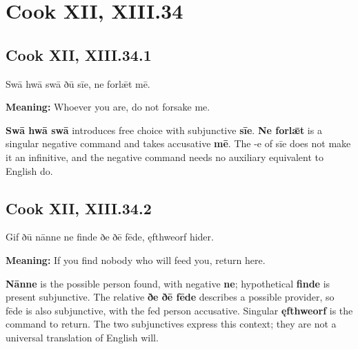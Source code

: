 \clearpage
\section*{Cook XII, XIII.34}

\par\begin{minipage}{\linewidth}\raggedright
\subsection*{Cook XII, XIII.34.1}

Swā hwā swā ðū sīe, ne forlǣt mē.

\textbf{Meaning:} Whoever you are, do not forsake me.

\textbf{Swā hwā swā} introduces free choice with subjunctive \textbf{sīe}. \textbf{Ne forlǣt} is a singular negative command and takes accusative \textbf{mē}. The -e of sīe does not make it an infinitive, and the negative command needs no auxiliary equivalent to English do.

\end{minipage}\par\addvspace{4pt}

\par\begin{minipage}{\linewidth}\raggedright
\subsection*{Cook XII, XIII.34.2}

Gif ðū nānne ne finde ðe ðē fēde, ęfthweorf hider.

\textbf{Meaning:} If you find nobody who will feed you, return here.

\textbf{Nānne} is the possible person found, with negative \textbf{ne}; hypothetical \textbf{finde} is present subjunctive. The relative \textbf{ðe ðē fēde} describes a possible provider, so fēde is also subjunctive, with the fed person accusative. Singular \textbf{ęfthweorf} is the command to return. The two subjunctives express this context; they are not a universal translation of English will.

\end{minipage}\par\addvspace{4pt}

